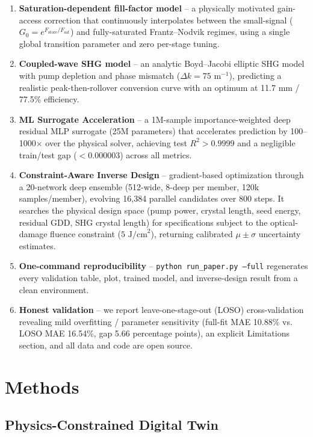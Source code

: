 \documentclass[aps,reprint,twocolumn,amsmath,amssymb,graphicx,nofootinbib]{revtex4-2}
\begin{document}
\begin{enumerate}
    \item \textbf{Saturation-dependent fill-factor model} -- a physically motivated gain-access correction that continuously interpolates between the small-signal ($G_0 = e^{F_{\text{store}}/F_{\text{sat}}}$) and fully-saturated Frantz--Nodvik regimes, using a single global transition parameter and zero per-stage tuning.
    \item \textbf{Coupled-wave SHG model} -- an analytic Boyd--Jacobi elliptic SHG model with pump depletion and phase mismatch ($\Delta k = 75\text{ m}^{-1}$), predicting a realistic peak-then-rollover conversion curve with an optimum at 11.7 mm / 77.5\% efficiency.
    \item \textbf{ML Surrogate Acceleration} -- a 1M-sample importance-weighted deep residual MLP surrogate (25M parameters) that accelerates prediction by 100--1000$\times$ over the physical solver, achieving test $R^2 > 0.9999$ and a negligible train/test gap ($<0.000003$) across all metrics.
    \item \textbf{Constraint-Aware Inverse Design} -- gradient-based optimization through a 20-network deep ensemble (512-wide, 8-deep per member, 120k samples/member), evolving 16,384 parallel candidates over 800 steps. It searches the physical design space (pump power, crystal length, seed energy, residual GDD, SHG crystal length) for specifications subject to the optical-damage fluence constraint ($5\text{ J/cm}^2$), returning calibrated $\mu \pm \sigma$ uncertainty estimates.
    \item \textbf{One-command reproducibility} -- \texttt{python run_paper.py --full} regenerates every validation table, plot, trained model, and inverse-design result from a clean environment.
    \item \textbf{Honest validation} -- we report leave-one-stage-out (LOSO) cross-validation revealing mild overfitting / parameter sensitivity (full-fit MAE 10.88\% vs. LOSO MAE 16.54\%, gap 5.66 percentage points), an explicit Limitations section, and all data and code are open source.
\end{enumerate}

\section{Methods}

\subsection{Physics-Constrained Digital Twin}
\end{document}
